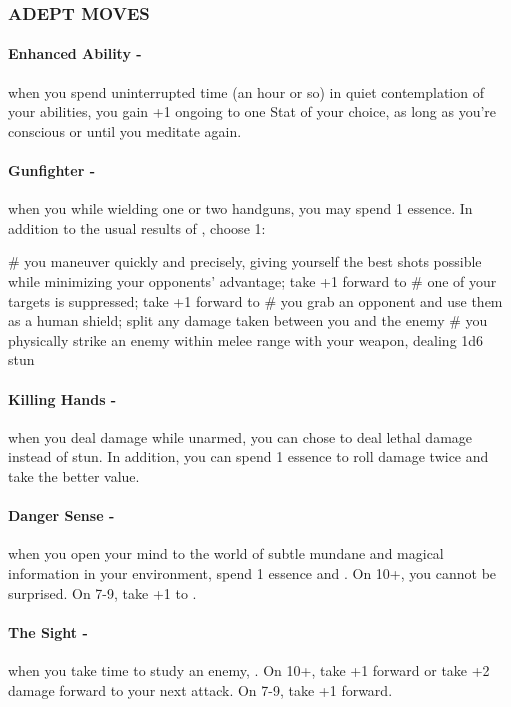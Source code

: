 \subsubsection{ADEPT MOVES}
\paragraph{Enhanced Ability -} when you spend uninterrupted time (an hour or so) in quiet contemplation of your abilities, you gain +1 ongoing to one Stat of your choice, as long as you’re conscious or until you meditate again.

\paragraph{Gunfighter -} when you  while wielding one or two handguns, you may spend 1 essence. In addition to the usual results of , choose 1:
    \begin{easylist}
        # you maneuver quickly and precisely, giving yourself the best shots possible while minimizing your opponents’ advantage; take +1 forward to 
        # one of your targets is suppressed; take +1 forward to 
        # you grab an opponent and use them as a human shield; split any damage taken between you and the enemy
        # you physically strike an enemy within melee range with your weapon, dealing 1d6 stun
    \end{easylist}

\paragraph{Killing Hands -} when you deal damage while unarmed, you can chose to deal lethal damage instead of stun. In addition, you can spend 1 essence to roll damage twice and take the better value.

\paragraph{Danger Sense -} when you open your mind to the world of subtle mundane and magical information in your environment, spend 1 essence and . On 10+, you cannot be surprised. On 7-9, take +1 to .

\paragraph{The Sight -} when you take time to study an enemy, . On 10+, take +1 forward or take +2 damage forward to your next attack. On 7-9, take +1 forward.

